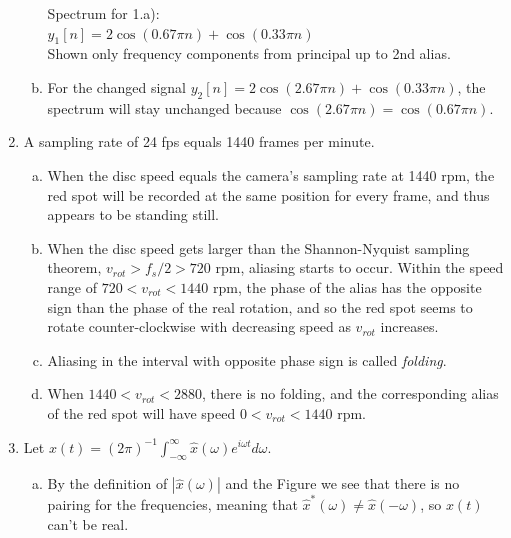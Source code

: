 \begin{enumerate}
\begin{enumerate}[a)]
\begin{marginfigure}
\begin{center}
		  \end{center}
		\caption{Spectrum for 1.a): \\ $y_1[n] = 2 \cos(0.67 \pi n) + \cos(0.33 \pi n)$ \\ Shown only frequency components from principal up to 2nd alias.}
		\label{fig:ex1}
		\end{marginfigure}
    
    \item For the changed signal $y_2[n] = 2 \cos(2.67 \pi n) + \cos(0.33 \pi n)$, the spectrum will stay unchanged because $\cos(2.67 \pi n) = \cos(0.67 \pi n)$.
  \end{enumerate}
  
\item A sampling rate of 24 fps equals 1440 frames per minute.
\begin{enumerate}[a)]
    \item When the disc speed equals the camera's sampling rate at 1440 rpm, the red spot will be recorded at the same position for every frame, and thus appears to be standing still.
    \item When the disc speed gets larger than the Shannon-Nyquist sampling theorem, $v_{rot} > f_s / 2 > 720$ rpm, aliasing starts to occur. Within the speed range of $720 < v_{rot} < 1440$ rpm, the phase of the alias has the opposite sign than the phase of the real rotation, and so the red spot seems to rotate counter-clockwise with decreasing speed as $v_{rot}$ increases.
    \item Aliasing in the interval with opposite phase sign is called \emph{folding}.
    \item When $1440 < v_{rot} < 2880$, there is no folding, and the corresponding alias of the red spot will have speed $0 < v_{rot} < 1440$ rpm.
\end{enumerate}

\item Let $x(t)=(2\pi)^{-1}\int_{-\infty}^{\infty}\hat{x}(\omega)e^{i\omega t}d\omega$.

\begin{enumerate}[a)]
\item By the definition of $|\hat{x}(\omega)|$ and the Figure we see that there is no pairing for the frequencies, meaning that $\hat{x}^{*}(\omega)\neq \hat{x}(-\omega)$, so $x(t)$ can't be real.


\end{enumerate}
\end{enumerate}
